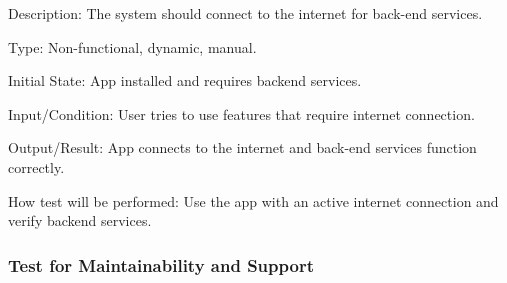 \documentclass[12pt, titlepage]{article}
\begin{document}
\begin{enumerate}
Description: The system should connect to the internet for back-end services.

Type: Non-functional, dynamic, manual.

Initial State: App installed and requires backend services.

Input/Condition: User tries to use features that require internet 
connection.

Output/Result: App connects to the internet and back-end services function correctly.

How test will be performed: Use the app with an active internet connection and verify backend services.

\end{enumerate}


\subsubsection{Test for Maintainability and Support}
\end{document}
